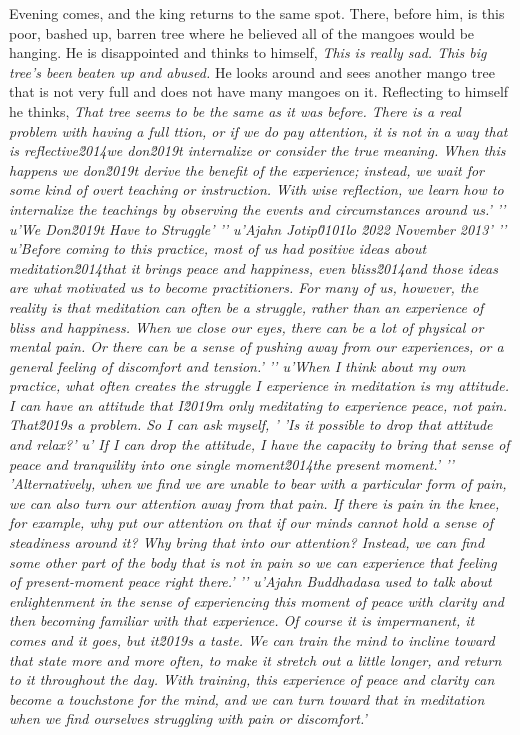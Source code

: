 Evening comes, and the king returns to the same spot. There, before 
him, is this poor, bashed up, barren tree where he believed all of the 
mangoes would be hanging. He is disappointed and thinks to himself, 
\emph{This is really sad. This big tree's been beaten up and abused.} 
He looks around and sees another mango tree that is not very full and 
does not have many mangoes on it. Reflecting to himself he thinks, 
\emph{That tree seems to be the same as it was before. There is a real 
problem with having a full ttion, or if we do pay attention, it is not in a way that is reflective\u2014we don\u2019t internalize or consider the true meaning. When this happens we don\u2019t derive the benefit of the experience; instead, we wait for some kind of overt teaching or instruction. With wise reflection, we learn how to internalize the teachings by observing the events and circumstances around us.'
'\n'
u'We Don\u2019t Have to Struggle'
'\n'
u'Ajahn Jotip\u0101lo \u2022 November 2013'
'\n'
u'Before coming to this practice, most of us had positive ideas about meditation\u2014that it brings peace and happiness, even bliss\u2014and those ideas are what motivated us to become practitioners. For many of us, however, the reality is that meditation can often be a struggle, rather than an experience of bliss and happiness. When we close our eyes, there can be a lot of physical or mental pain. Or there can be a sense of pushing away from our experiences, or a general feeling of discomfort and tension.'
'\n'
u'When I think about my own practice, what often creates the struggle I experience in meditation is my attitude. I can have an attitude that I\u2019m only meditating to experience peace, not pain. That\u2019s a problem. So I can ask myself, '
'Is it possible to drop that attitude and relax?'
u' If I can drop the attitude, I have the capacity to bring that sense of peace and tranquility into one single moment\u2014the present moment.'
'\n'
'Alternatively, when we find we are unable to bear with a particular form of pain, we can also turn our attention away from that pain. If there is pain in the knee, for example, why put our attention on that if our minds cannot hold a sense of steadiness around it? Why bring that into our attention? Instead, we can find some other part of the body that is not in pain so we can experience that feeling of present-moment peace right there.'
'\n'
u'Ajahn Buddhadasa used to talk about enlightenment in the sense of experiencing this moment of peace with clarity and then becoming familiar with that experience. Of course it is impermanent, it comes and it goes, but it\u2019s a taste. We can train the mind to incline toward that state more and more often, to make it stretch out a little longer, and return to it throughout the day. With training, this experience of peace and clarity can become a touchstone for the mind, and we can turn toward that in meditation when we find ourselves struggling with pain or discomfort.'
}
